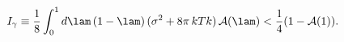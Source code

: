 \begin{equation}
I_\gamma \equiv \frac{1}{8}\int_0^1 d\lam\,(1-\lam)\,(\sigma^2 + 8\pi\, kTk)
\,{\cal A}(\lam)
< \frac{1}{4}(1-{\cal A}(1)).
\label{eq:fmwproof}\end{equation}


